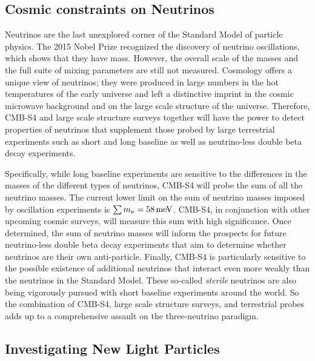 \subsection*{Cosmic constraints on Neutrinos}


Neutrinos are the last unexplored corner of the Standard Model of particle physics.  The 2015 Nobel Prize recognized the discovery of neutrino oscillations, which shows that they have mass. However, the overall scale of the masses and the full suite of mixing parameters are still not measured.  Cosmology offers a unique view of neutrinos; they were produced in large numbers in the hot temperatures of the early universe and left a distinctive imprint in the cosmic microwave background and on the large scale structure of the universe. Therefore, CMB-S4 and large scale structure surveys together will have the power to detect properties of neutrinos that supplement those probed by large terrestrial experiments such as short and long baseline as well as neutrino-less double beta decay experiments.

Specifically, while long baseline experiments are sensitive to the differences in the masses of the different types of neutrinos, CMB-S4  will probe the sum of all the neutrino masses. The current lower limit on the sum of neutrino masses imposed by oscillation experiments is \mbox{$\sum m_\nu=58\,\rm{meV}$}. CMB-S4, in conjunction with other upcoming cosmic surveys, will measure this sum with high significance. Once determined, the sum of neutrino masses will inform the prospects for future neutrino-less double beta decay experiments that aim to determine whether neutrinos are their own anti-particle. Finally, CMB-S4 is particularly sensitive to the possible existence of additional neutrinos that interact even more weakly than the neutrinos in the Standard Model. These so-called {\it sterile} neutrinos are also being vigorously pursued with short baseline experiments around the world. So the combination of CMB-S4, large scale structure surveys, and terrestrial probes adds up to a comprehensive assault on the three-neutrino paradigm. 

\subsection*{Investigating New Light Particles}


